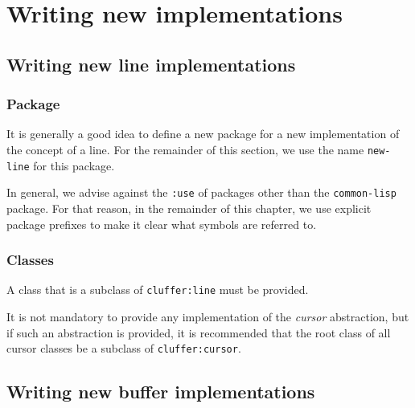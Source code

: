 \chapter{Writing new implementations}

\section{Writing new line implementations}

\subsection{Package}

It is generally a good idea to define a new package for a new
implementation of the concept of a line.  For the remainder of this
section, we use the name \texttt{new-line} for this package.

In general, we advise against the \texttt{:use} of packages other than
the \texttt{common-lisp} package.  For that reason, in the remainder
of this chapter, we use explicit package prefixes to make it clear
what symbols are referred to.

\subsection{Classes}

A class that is a subclass of \texttt{cluffer:line} must be provided.

It is not mandatory to provide any implementation of the \emph{cursor}
abstraction, but if such an abstraction is provided, it is recommended
that the root class of all cursor classes be a subclass of
\texttt{cluffer:cursor}.

\section{Writing new buffer implementations}

